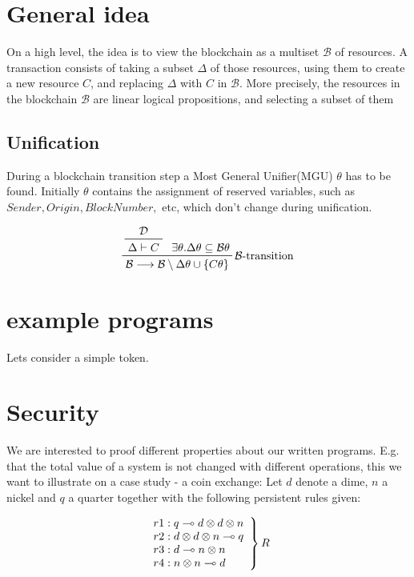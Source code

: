 \documentclass[sigconf]{acmart}
\begin{document}
\section{General idea}
On a high level, the idea is to view the blockchain as a multiset $\mathcal{B}$ of resources. A transaction consists of taking a subset $\Delta$ of those resources, using them to create a new resource $C$, and replacing $\Delta$ with $C$ in $\mathcal{B}$. More precisely, the resources in the blockchain $\mathcal{B}$ are linear logical propositions, and selecting a subset of them

\subsection{Unification}
During a blockchain transition step a Most General Unifier(MGU) $\theta$ has to be found. Initially $\theta$ contains the assignment of reserved variables, such as $Sender, Origin, BlockNumber, $ etc, which don't change during unification.

\begin{equation}
  \prftree[r]
  {$\mathcal{B}$-transition}
  {
    \prftree
    {
      \mathcal{D}
    } {
      \Delta\vdash C
    }
  }
  {\exists\theta. \Delta\theta \subseteq \mathcal{B}\theta}
  {\mathcal{B} \longrightarrow \mathcal{B} \setminus \Delta\theta \cup \{C\theta\}}
\end{equation}

\section{example programs}

Lets consider a simple token.


\section{Security}
We are interested to proof different properties about our written programs. E.g. that the total value of a system is not changed with different operations, this we want to illustrate on a case study - a coin exchange:
Let $d$ denote a dime, $n$ a nickel and $q$ a quarter together with the following persistent rules given:

\[\left.\\
\begin{array}{l}
r1: q\multimap d\otimes d\otimes n \\
r2: d\otimes d\otimes n\multimap q \\
r3: d\multimap n\otimes n \\
r4: n\otimes n\multimap d \\
\end{array}
\right\} R\]
\end{document}
